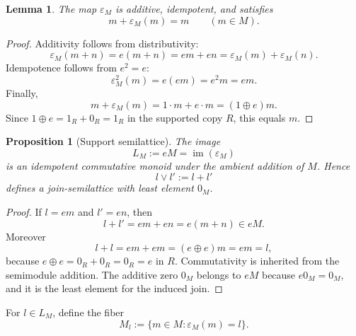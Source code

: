 \documentclass[11pt]{article}
\newcommand{\im}{\operatorname{im}}
\newcommand{\eps}{\varepsilon}
\newcommand{\1}{\mathbf 1}
\newtheorem{proposition}[theorem]{Proposition}
\newtheorem{lemma}[theorem]{Lemma}
\numberwithin{equation}{section}
\begin{document}
\begin{lemma}\label{lem:epsilon}
The map $\eps_M$ is additive, idempotent, and satisfies
\begin{equation}\label{eq:absorbing-proj}
  m+\eps_M(m)=m
  \qquad(m\in M).
\end{equation}
\end{lemma}

\begin{proof}
Additivity follows from distributivity:
\begin{equation}
  \eps_M(m+n)=e(m+n)=em+en=\eps_M(m)+\eps_M(n).
\end{equation}
Idempotence follows from $e^2=e$:
\begin{equation}
  \eps_M^2(m)=e(em)=e^2m=em.
\end{equation}
Finally,
\begin{equation}
  m+\eps_M(m)=1\cdot m+e\cdot m=(1\oplus e)m.
\end{equation}
Since $1\oplus e=1_R+0_R=1_R$ in the supported copy $R$, this equals $m$.
\end{proof}

\begin{proposition}[Support semilattice]\label{prop:support-semilattice}
The image
\begin{equation}
  L_M:=eM=\im(\eps_M)
\end{equation}
is an idempotent commutative monoid under the ambient addition of $M$.  Hence
\begin{equation}
  l\vee l':=l+l'
\end{equation}
defines a join-semilattice with least element $0_M$.
\end{proposition}

\begin{proof}
If $l=em$ and $l'=en$, then
\begin{equation}
  l+l'=em+en=e(m+n)\in eM.
\end{equation}
Moreover
\begin{equation}
  l+l=em+em=(e\oplus e)m=em=l,
\end{equation}
because $e\oplus e=0_R+0_R=0_R=e$ in $R$.  Commutativity is inherited from the semimodule addition.  The additive zero $0_M$ belongs to $eM$ because $e0_M=0_M$, and it is the least element for the induced join.
\end{proof}

For $l\in L_M$, define the fiber
\begin{equation}
  M_l:=\{m\in M:\eps_M(m)=l\}.
\end{equation}
\end{document}

